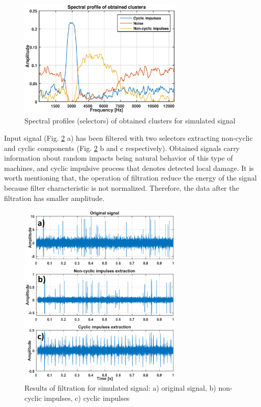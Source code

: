 \documentclass[preprint,12pt]{elsarticle}
\begin{document}
\begin{figure}[!ht]
\centering
\includegraphics[width = 0.7\textwidth]{figs3/selector_plot.eps}
\caption{Spectral profiles (selectors) of obtained clusters for simulated signal}
\label{fig: selplots}
\end{figure}

Input signal (Fig. \ref{fig: outplots} a) has been filtered with two selectors extracting non-cyclic and cyclic components (Fig. \ref{fig: outplots} b and c respectively). Obtained signals carry information about random impacts being natural behavior of this type of machines, and cyclic impulsive process that denotes detected local damage. It is worth mentioning that, the operation of filtration reduce the energy of the signal because filter characteristic is not normalized. Therefore, the data after the filtration has smaller amplitude.

\begin{figure}[!ht]
\centering
\includegraphics[width = 0.7\textwidth]{figs3/output_plots.png}
\caption{Results of filtration for simulated signal: a) original signal, b) non-cyclic impulses, c) cyclic impulses}
\label{fig: outplots}
\end{figure}
\end{document}
